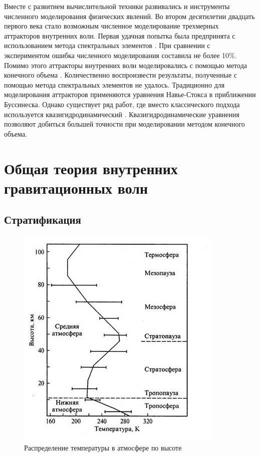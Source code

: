 Вместе с развитием вычислительной техники развивались и инструменты численного моделирования физических явлений. Во втором десятилетии двадцать первого века стало возможным численное моделирование трехмерных аттракторов внутренних волн. Первая удачная попытка была предпринята с использованием метода спектральных элементов \cite{Brouzet2016,Brouzet_2016}. При сравнении с экспериментом ошибка численного моделирования составила не более 10\%. Помимо этого аттракторы внутренних волн моделировались с помощью метода конечного объема \cite{Brouzet2014}. Количественно воспроизвести результаты, полученные с помощью метода спектральных элементов не удалось.
Традиционно для моделирования аттракторов применяются уравнения Навье-Стокса в приближении Буссинеска. Однако существует ряд работ, где вместо классического подхода используется квазигидродинамический \cite{ElizarBook}. Квазигидродинамические уравнения позволяют добиться большей точности \cite{Kraposhin20182} при моделировании методом конечного объема.



\section{Общая теория внутренних гравитационных волн}

\subsection{Стратификация}

\begin{figure}
    \centering
    \includegraphics{pics/tempDistrib.jpg}
    \caption{Распределение температуры в атмосфере по высоте}
    \label{fig:temperatureDistrib}
\end{figure}

